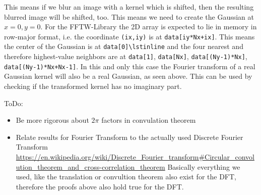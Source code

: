 \documentclass[10pt,a4paper]{article}
\begin{document}
This means if we blur an image with a kernel which is shifted, then the resulting blurred image will be shifted, too.
This means we need to create the Gaussian at $x=0,y=0$.
For the FFTW-Library the 2D array is expected to lie in memory in row-major format, i.e. the coordinate \lstinline!(ix,iy)! is at \lstinline!data[iy*Nx+ix]!.
This means the center of the Gaussian is at \lstinline!data[0]\lstinline! and the four nearest and therefore highest-value neighbors are at \lstinline!data[1]!, \lstinline!data[Nx]!, \lstinline!data[(Ny-1)*Nx]!, \lstinline!data[(Ny-1)*Nx+Nx-1]!.
In this and only this case the Fourier transform of a real Gaussian kernel will also be a real Gaussian, as seen above. This can be used by checking if the transformed kernel has no imaginary part.


ToDo:
\begin{itemize}
    \item Be more rigorous about $2\pi$ factors in convulation theorem
    \item Relate results for Fourier Transform to the actually used Discrete Fourier Transform \url{https://en.wikipedia.org/wiki/Discrete_Fourier_transform#Circular_convolution_theorem_and_cross-correlation_theorem}
    Basically everything we used, like the translation or convultion theorem also exist for the DFT, therefore the proofs above also hold true for the DFT.
\end{itemize}
\end{document}

